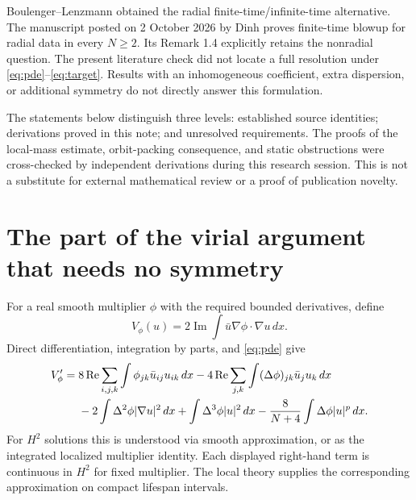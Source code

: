 \documentclass[11pt,a4paper]{article}
\theoremstyle{remark}\newtheorem{remark}[theorem]{Remark}
\newcommand{\dd}{\,dx}
\DeclareMathOperator{\Rea}{Re}
\DeclareMathOperator{\Ima}{Im}
\begin{document}
Boulenger--Lenzmann \cite{BL} obtained the radial finite-time/infinite-time alternative. The manuscript posted on 2 October 2026 by Dinh \cite{Dinh} proves finite-time blowup for radial data in every $N\ge2$. Its Remark 1.4 explicitly retains the nonradial question. The present literature check did not locate a full resolution under \eqref{eq:pde}--\eqref{eq:target}. Results with an inhomogeneous coefficient, extra dispersion, or additional symmetry do not directly answer this formulation.

The statements below distinguish three levels: established source identities; derivations proved in this note; and unresolved requirements. The proofs of the local-mass estimate, orbit-packing consequence, and static obstructions were cross-checked by independent derivations during this research session. This is not a substitute for external mathematical review or a proof of publication novelty.

\section{The part of the virial argument that needs no symmetry}
For a real smooth multiplier $\phi$ with the required bounded derivatives, define
\[
 V_\phi(u)=2\Ima\int\bar u\nabla\phi\cdot\nabla u\dd.
\]
Direct differentiation, integration by parts, and \eqref{eq:pde} give
\begin{align}
 V_\phi'={}&8\Rea\sum_{i,j,k}\int\phi_{jk}\bar u_{ij}u_{ik}\dd
 -4\Rea\sum_{j,k}\int(\Delta\phi)_{jk}\bar u_j u_k\dd\notag\\
 &-2\int\Delta^2\phi|\nabla u|^2\dd
 +\int\Delta^3\phi|u|^2\dd
 -\frac8{N+4}\int\Delta\phi|u|^p\dd.\label{eq:virial}
\end{align}
For $H^2$ solutions this is understood via smooth approximation, or as the integrated localized multiplier identity. Each displayed right-hand term is continuous in $H^2$ for fixed multiplier. The local theory supplies the corresponding approximation on compact lifespan intervals.
\end{document}
